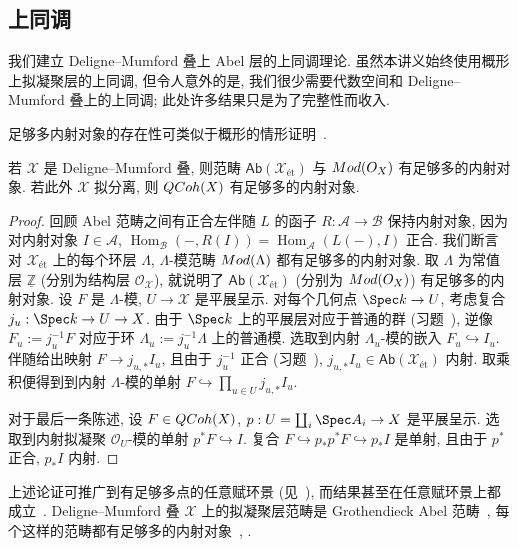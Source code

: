 \subsection{上同调}\label{src:5.1.6-subsection}
我们建立 Deligne--Mumford 叠上 Abel 层的上同调理论. 虽然本讲义始终使用概形上拟凝聚层的上同调, 但令人意外的是, 我们很少需要代数空间和 Deligne--Mumford 叠上的上同调; 此处许多结果只是为了完整性而收入.

足够多内射对象的存在性可类似于概形的情形证明~\cite[命题 2.2]{Har77}.
\begin{lemma}\label{src:5.1.34}
若 $\mathcal X$ 是 Deligne--Mumford 叠, 则范畴 $\mathsf{Ab}(\mathcal X_{\text{ét}})$ 与 $Mod(O_{X})$ 有足够多的内射对象. 若此外 $\mathcal X$ 拟分离, 则 $QCoh(X)$ 有足够多的内射对象.
\end{lemma}
\begin{proof}
回顾 Abel 范畴之间有正合左伴随 $L$ 的函子 $R:\mathcal A\to\mathcal B$ 保持内射对象, 因为对内射对象 $I\in\mathcal A$, $\operatorname{Hom}_{\mathcal B}(-,R(I))=\operatorname{Hom}_{\mathcal A}(L(-),I)$ 正合. 我们断言对 $\mathcal X_{\text{ét}}$ 上的每个环层 $\Lambda$, $\Lambda$-模范畴 $Mod(\Lambda)$ 都有足够多的内射对象. 取 $\Lambda$ 为常值层 $\underline{\mathbb Z}$ (分别为结构层 $\mathcal O_{\mathcal X}$), 就说明了 $\mathsf{Ab}(\mathcal X_{\text{ét}})$ (分别为 $Mod(O_{X})$) 有足够多的内射对象. 设 $F$ 是 $\Lambda$-模, $U\to\mathcal X$ 是平展呈示. 对每个几何点 $\Spec k\to U$, 考虑复合 $j_u:\Spec k\to U\to\mathcal X$. 由于 $\Spec k$ 上的平展层对应于普通的群 (习题~), 逆像 $F_u:=j_u^{-1}F$ 对应于环 $\Lambda_u:=j_u^{-1}\Lambda$ 上的普通模. 选取到内射 $\Lambda_u$-模的嵌入 $F_u\hookrightarrow I_u$. 伴随给出映射 $F\to j_{u,*}I_u$, 且由于 $j_u^{-1}$ 正合 (习题~), $j_{u,*}I_u\in\mathsf{Ab}(\mathcal X_{\text{ét}})$ 内射. 取乘积便得到到内射 $\Lambda$-模的单射 $F\hookrightarrow\prod_{u\in U}j_{u,*}I_u$.

对于最后一条陈述, 设 $F\in QCoh(X)$, $p:U=\coprod_i\Spec A_i\to\mathcal X$ 是平展呈示. 选取到内射拟凝聚 $\mathcal O_U$-模的单射 $p^*F\hookrightarrow I$. 复合 $F\hookrightarrow p_*p^*F\hookrightarrow p_*I$ 是单射, 且由于 $p^*$ 正合, $p_*I$ 内射.
\end{proof}
\begin{remark}\label{src:5.1.35}
上述论证可推广到有足够多点的任意赋环景 (见~\cite[定理 2.3.2]{Ols16}), 而结果甚至在任意赋环景上都成立~\cite[Tag 01DP]{SP}. Deligne--Mumford 叠 $\mathcal X$ 上的拟凝聚层范畴是 Grothendieck Abel 范畴~\cite[Tag 0781]{SP}, 每个这样的范畴都有足够多的内射对象~\cite{Gro57b}, \cite[Tag 079H]{SP}.
\end{remark}
